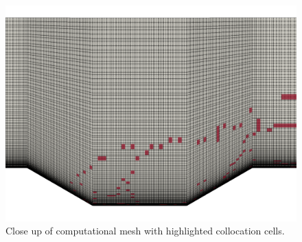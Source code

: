 \begin{figure} 
\begin{center}
\includegraphics[trim={0cm 0cm 0cm 0cm},clip,width=0.65\linewidth]{figs/cavity/hyper_grid.png}
\caption{Close up of computational mesh with highlighted collocation cells.} 
\label{fig:cav_sampmesh}
\end{center}
\end{figure}

